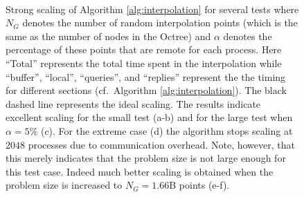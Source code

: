 \begin{figure}[htbp]
\begin{center}
		\\
		 \hspace{0.5 in}
	\end{center}
	\caption{Strong scaling of Algorithm \ref{alg:interpolation} for several tests where $N_G$ denotes the number of random interpolation points (which is the same as the number of nodes in the Octree) and $\alpha$ denotes the percentage of these points that are remote for each process. Here ``Total'' represents the total time spent in the interpolation while ``buffer'', ``local'', ``queries'', and ``replies'' represent the the timing for different sections (cf.\ Algorithm \ref{alg:interpolation}). The black dashed line represents the ideal scaling. The results indicate excellent scaling for the small test (a-b) and for the large test when $\alpha = 5\%$ (c). For the extreme case (d) the algorithm stops scaling at $2048$ processes due to communication overhead. Note, however, that this merely indicates that the problem size is not large enough for this test case. Indeed much better scaling is obtained when the problem size is increased to $N_G = 1.66$B points (e-f).}
	\label{fig:interpolation}
\end{figure}

